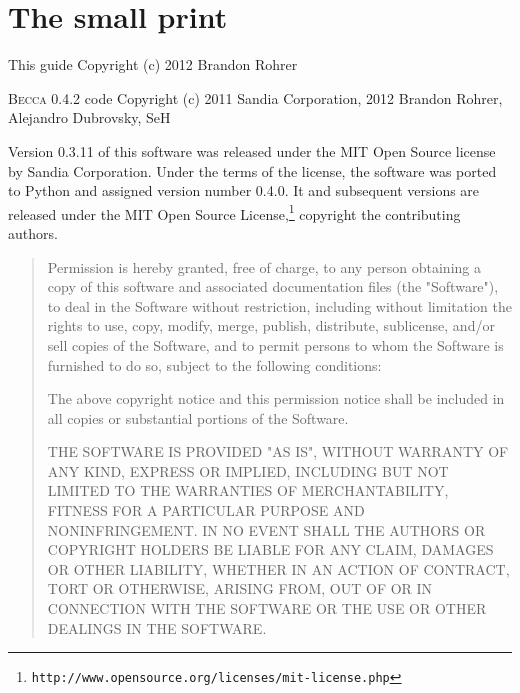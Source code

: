 \chapter{The small print}

This guide
Copyright (c) 2012 Brandon Rohrer

\textsc{Becca} 0.4.2 code
Copyright (c) 2011 Sandia Corporation,
2012 Brandon Rohrer, Alejandro Dubrovsky, SeH

Version 0.3.11 of this software was released under the MIT Open Source 
license by Sandia Corporation. Under the terms of the license, the 
software was ported to Python and assigned version number 0.4.0. It and
subsequent versions are released under the MIT Open Source License,\footnote{\texttt{http://www.opensource.org/licenses/mit-license.php}} copyright the contributing authors.

\begin{quote}
Permission is hereby granted, free of charge, to any person obtaining a copy
of this software and associated documentation files (the "Software"), to deal
in the Software without restriction, including without limitation the rights
to use, copy, modify, merge, publish, distribute, sublicense, and/or sell
copies of the Software, and to permit persons to whom the Software is
furnished to do so, subject to the following conditions:

The above copyright notice and this permission notice shall be included in
all copies or substantial portions of the Software.

THE SOFTWARE IS PROVIDED "AS IS", WITHOUT WARRANTY OF ANY KIND, EXPRESS OR
IMPLIED, INCLUDING BUT NOT LIMITED TO THE WARRANTIES OF MERCHANTABILITY,
FITNESS FOR A PARTICULAR PURPOSE AND NONINFRINGEMENT. IN NO EVENT SHALL THE
AUTHORS OR COPYRIGHT HOLDERS BE LIABLE FOR ANY CLAIM, DAMAGES OR OTHER
LIABILITY, WHETHER IN AN ACTION OF CONTRACT, TORT OR OTHERWISE, ARISING FROM,
OUT OF OR IN CONNECTION WITH THE SOFTWARE OR THE USE OR OTHER DEALINGS IN
THE SOFTWARE.

\end{quote}